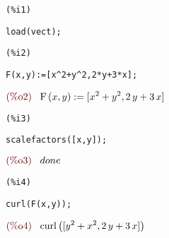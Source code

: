 \documentclass[12pt]{article}
\begin{document}
\noindent
\begin{minipage}[t]{8ex}{\color{red}\bf
\begin{verbatim}
(%i1) 
\end{verbatim}}
\end{minipage}
\begin{minipage}[t]{\textwidth}{\color{blue}
\begin{verbatim}
load(vect);
\end{verbatim}}
\end{minipage}


\noindent
\begin{minipage}[t]{8ex}{\color{red}\bf
\begin{verbatim}
(%i2) 
\end{verbatim}}
\end{minipage}
\begin{minipage}[t]{\textwidth}{\color{blue}
\begin{verbatim}
F(x,y):=[x^2+y^2,2*y+3*x];
\end{verbatim}}
\end{minipage}
\begin{math}\displaystyle
\parbox{8ex}{\color{labelcolor}(\%o2) }
\mathrm{F}\left( x,y\right) :=[{x}^{2}+{y}^{2},2\,y+3\,x]
\end{math}


\noindent
\begin{minipage}[t]{8ex}{\color{red}\bf
\begin{verbatim}
(%i3) 
\end{verbatim}}
\end{minipage}
\begin{minipage}[t]{\textwidth}{\color{blue}
\begin{verbatim}
scalefactors([x,y]);
\end{verbatim}}
\end{minipage}
\begin{math}\displaystyle
\parbox{8ex}{\color{labelcolor}(\%o3) }
done
\end{math}


\noindent
\begin{minipage}[t]{8ex}{\color{red}\bf
\begin{verbatim}
(%i4) 
\end{verbatim}}
\end{minipage}
\begin{minipage}[t]{\textwidth}{\color{blue}
\begin{verbatim}
curl(F(x,y));
\end{verbatim}}
\end{minipage}
\begin{math}\displaystyle
\parbox{8ex}{\color{labelcolor}(\%o4) }
\mathrm{curl}\left( [{y}^{2}+{x}^{2},2\,y+3\,x]\right) 
\end{math}
\end{document}
